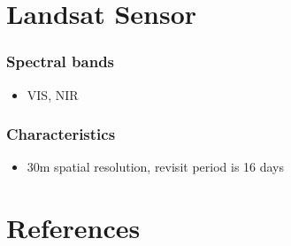 \documentclass[
  letterpaper,
  DIV=11,
  numbers=noendperiod]{scrreprt}
\providecommand{\tightlist}{%
  \setlength{\itemsep}{0pt}\setlength{\parskip}{0pt}}\usepackage{longtable,booktabs,array}
\newlength{\cslhangindent}
\newlength{\cslentryspacingunit} %
\newenvironment{CSLReferences}[2] %
 {%
  \setlength{\parindent}{0pt}
  \ifodd #1
  \let\oldpar\par
  \def\par{\hangindent=\cslhangindent\oldpar}
  \fi
  \setlength{\parskip}{#2\cslentryspacingunit}
 }%
 {}
\begin{document}

\hypertarget{landsat-sensor}{%
\chapter{Landsat Sensor}\label{landsat-sensor}}

\hypertarget{spectral-bands}{%
\subsection{Spectral bands}\label{spectral-bands}}

\begin{itemize}
\tightlist
\item
  VIS, NIR
\end{itemize}

\hypertarget{characteristics}{%
\subsection{Characteristics}\label{characteristics}}

\begin{itemize}
\tightlist
\item
  30m spatial resolution, revisit period is 16 days
\end{itemize}


\hypertarget{references}{%
\chapter*{References}\label{references}}

\hypertarget{refs}{}
\begin{CSLReferences}{0}{0}
\end{CSLReferences}
\end{document}
